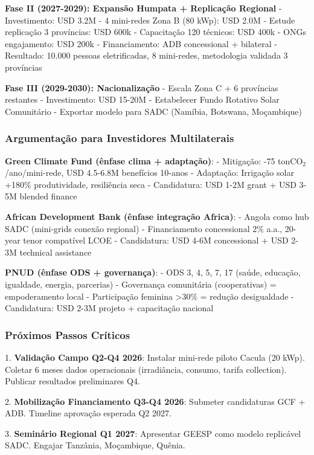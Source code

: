 \documentclass[12pt, a4paper]{article}
\begin{document}
\textbf{Fase II (2027-2029): Expansão Humpata + Replicação Regional}
- Investimento: USD 3.2M
  - 4 mini-redes Zona B (80 kWp): USD 2.0M
  - Estude replicação 3 províncias: USD 600k
  - Capacitação 120 técnicos: USD 400k
  - ONGs engajamento: USD 200k
- Financiamento: ADB concessional + bilateral
- Resultado: 10.000 pessoas eletrificadas, 8 mini-redes, metodologia validada 3 províncias

\textbf{Fase III (2029-2030): Nacionalização}
- Escala Zona C + 6 províncias restantes
- Investimento: USD 15-20M
- Estabelecer Fundo Rotativo Solar Comunitário
- Exportar modelo para SADC (Namíbia, Botswana, Moçambique)

\subsubsection{Argumentação para Investidores Multilaterais}

\textbf{Green Climate Fund (ênfase clima + adaptação)}:
- Mitigação: -75 tonCO$_2$/ano/mini-rede, USD 4.5-6.8M benefícios 10-anos
- Adaptação: Irrigação solar +180\% produtividade, resiliência seca
- Candidatura: USD 1-2M grant + USD 3-5M blended finance

\textbf{African Development Bank (ênfase integração Africa)}:
- Angola como hub SADC (mini-grids conexão regional)
- Financiamento concessional 2\% a.a., 20-year tenor compatível LCOE
- Candidatura: USD 4-6M concessional + USD 2-3M technical assistance

\textbf{PNUD (ênfase ODS + governança)}:
- ODS 3, 4, 5, 7, 17 (saúde, educação, igualdade, energia, parcerias)
- Governança comunitária (cooperativas) = empoderamento local
- Participação feminina >30\% = redução desigualdade
- Candidatura: USD 2-3M projeto + capacitação nacional

\subsubsection{Próximos Passos Críticos}

1. \textbf{Validação Campo Q2-Q4 2026}: Instalar mini-rede piloto Cacula (20 kWp). Coletar 6 meses dados operacionais (irradiância, consumo, tarifa collection). Publicar resultados preliminares Q4.

2. \textbf{Mobilização Financiamento Q3-Q4 2026}: Submeter candidaturas GCF + ADB. Timeline aprovação esperada Q2 2027.

3. \textbf{Seminário Regional Q1 2027}: Apresentar GEESP como modelo replicável SADC. Engajar Tanzânia, Moçambique, Quênia.
\end{document}
